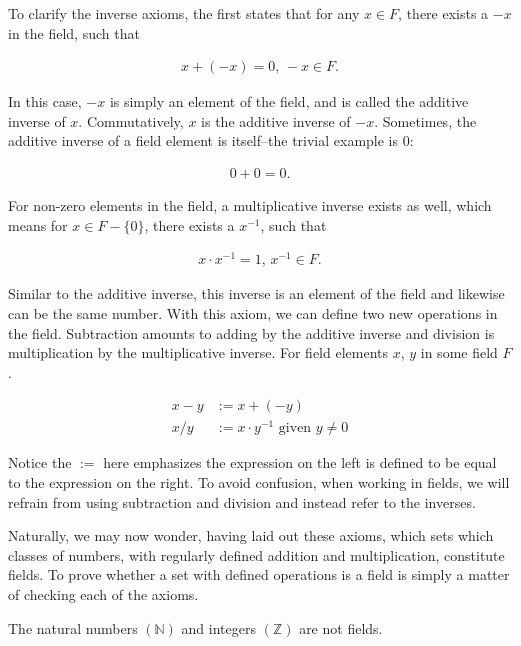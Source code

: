 \documentclass[twoside]{report}
\begin{document}
To clarify the inverse axioms, the first states that for any $x \in F$, there exists a $-x$ in the field, such that

\begin{align*}
	x + (-x) = 0, \, -x \in F.
\end{align*}

In this case, $-x$ is simply an element of the field, and is called the additive inverse of $x$. Commutatively, $x$ is the additive inverse of $-x$. Sometimes, the additive inverse of a field element is itself--the trivial example is 0:

\begin{align*}
	0 + 0 = 0.
\end{align*}

For non-zero elements in the field, a multiplicative inverse exists as well, which means for $x \in F - \{ 0 \}$, there exists a $x^{-1}$, such that

\begin{align*}
	x \cdot x^{-1} = 1,\, x^{-1} \in F.
\end{align*}

Similar to the additive inverse, this inverse is an element of the field and likewise can be the same number. With this axiom, we can define two new operations in the field. Subtraction amounts to adding by the additive inverse and division is multiplication by the multiplicative inverse. For field elements $x$, $y$ in some field $F$.

\begin{align}
	x - y &:= x + (-y) \\
	x / y &:= x \cdot y^{-1} \text{ given } y \neq 0
\end{align}

Notice the $:=$ here emphasizes the expression on the left is defined to be equal to the expression on the right. To avoid confusion, when working in fields, we will refrain from using subtraction and division and instead refer to the inverses.

Naturally, we may now wonder, having laid out these axioms, which sets which classes of numbers, with regularly defined addition and multiplication, constitute fields. To prove whether a set with defined operations is a field is simply a matter of checking each of the axioms. \\

\vspace{\baselineskip}
\begin{theorem}
	The natural numbers $(\mathbb{N})$ and integers $(\mathbb{Z})$ are not fields. 
\end{theorem}
\end{document}

